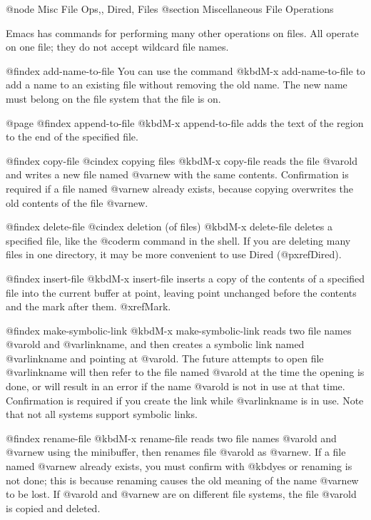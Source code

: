 {{{{{{{{{{{{{{{{{{{@node Misc File Ops,, Dired, Files
@section Miscellaneous File Operations

  Emacs has commands for performing many other operations on files.
All operate on one file; they do not accept wildcard file names.

@findex add-name-to-file
  You can use the command @kbd{M-x add-name-to-file} to add a name to an
existing file without removing the old name.  The new name must belong
on the file system that the file is on.

@page
@findex append-to-file
  @kbd{M-x append-to-file} adds the text of the region to the end of the
specified file.

@findex copy-file
@cindex copying files
  @kbd{M-x copy-file} reads the file @var{old} and writes a new file
named @var{new} with the same contents.  Confirmation is required if a
file named @var{new} already exists, because copying overwrites the old
contents of the file @var{new}.

@findex delete-file
@cindex deletion (of files)
  @kbd{M-x delete-file} deletes a specified file, like the @code{rm}
command in the shell.  If you are deleting many files in one directory, it
may be more convenient to use Dired (@pxref{Dired}).

@findex insert-file
  @kbd{M-x insert-file} inserts a copy of the contents of a specified
file into the current buffer at point, leaving point unchanged before the
contents and the mark after them.  @xref{Mark}.

@findex make-symbolic-link
  @kbd{M-x make-symbolic-link} reads two file names @var{old} and
@var{linkname}, and then creates a symbolic link named @var{linkname}
and pointing at @var{old}.  The future attempts to open file
@var{linkname} will then refer to the file named @var{old} at the time
the opening is done, or will result in an error if the name @var{old} is
not in use at that time.  Confirmation is required if you create the
link while @var{linkname} is in use.  Note that not all systems support
symbolic links.

@findex rename-file
  @kbd{M-x rename-file} reads two file names @var{old} and @var{new} using
the minibuffer, then renames file @var{old} as @var{new}.  If a file named
@var{new} already exists, you must confirm with @kbd{yes} or renaming is not
done; this is because renaming causes the old meaning of the name @var{new}
to be lost.  If @var{old} and @var{new} are on different file systems, the
file @var{old} is copied and deleted.

}}}}}}}}}}}}}}}}}}}
